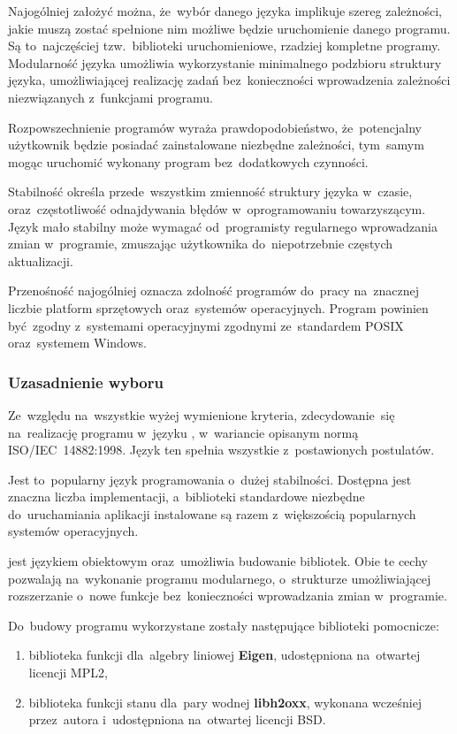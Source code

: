 Najogólniej założyć można, że~wybór danego języka implikuje szereg
zależności, jakie muszą zostać spełnione nim możliwe będzie uruchomienie
danego programu. Są to~najczęściej tzw.~biblioteki uruchomieniowe,
rzadziej kompletne programy. Modularność języka umożliwia wykorzystanie
minimalnego podzbioru struktury języka, umożliwiającej realizację zadań
bez~konieczności wprowadzenia zależności niezwiązanych z~funkcjami
programu.

Rozpowszechnienie programów wyraża prawdopodobieństwo, że~potencjalny
użytkownik będzie posiadać zainstalowane niezbędne zależności, tym~samym
mogąc uruchomić wykonany program bez~dodatkowych czynności.

Stabilność określa przede~wszystkim zmienność struktury języka w~czasie,
oraz~częstotliwość odnajdywania błędów w~oprogramowaniu towarzyszącym.
Język mało stabilny może wymagać od~programisty regularnego wprowadzania
zmian w~programie, zmuszając użytkownika do~niepotrzebnie częstych
aktualizacji.

Przenośność najogólniej oznacza zdolność programów do~pracy na~znacznej
liczbie platform sprzętowych oraz~systemów operacyjnych. Program
powinien być~zgodny z~systemami operacyjnymi zgodnymi ze~standardem
POSIX oraz~systemem Windows.


\subsubsection{Uzasadnienie wyboru}

Ze~względu na~wszystkie wyżej wymienione kryteria, zdecydowanie~się
na~realizację programu w~języku \Cpp, w~wariancie opisanym normą
ISO/IEC~14882:1998. Język ten spełnia wszystkie z~postawionych
postulatów.

Jest to~popularny język programowania o~dużej stabilności. Dostępna jest
znaczna liczba implementacji, a~biblioteki standardowe niezbędne
do~uruchamiania aplikacji instalowane są razem z~większością popularnych
systemów operacyjnych.

\Cpp jest językiem obiektowym oraz~umożliwia budowanie bibliotek. Obie te
cechy pozwalają na~wykonanie programu modularnego, o~strukturze
umożliwiającej rozszerzanie o~nowe funkcje bez~konieczności wprowadzania
zmian w~programie.

Do~budowy programu wykorzystane zostały następujące biblioteki
pomocnicze:

\begin{enumerate}

	\item biblioteka funkcji dla~algebry liniowej \textbf{Eigen}, udostępniona
		na~otwartej licencji MPL2,

	\item biblioteka funkcji stanu dla~pary wodnej \textbf{libh2oxx},
		wykonana wcześniej przez~autora i~udostępniona na~otwartej
		licencji BSD.

\end{enumerate}


